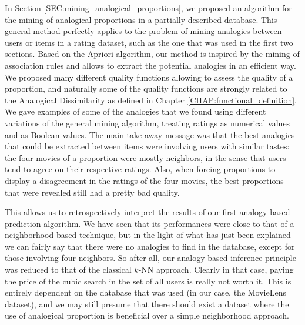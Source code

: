 In Section \ref{SEC:mining_analogical_proportions}, we proposed an algorithm for the mining of analogical
proportions in a partially described database. This general method perfectly
applies to the problem of mining analogies between users or items in a rating
dataset, such as the one that was used in the first two sections. Based on the
Apriori algorithm, our method is inspired by the mining of association rules
and allows to extract the potential analogies in an efficient way.
We proposed many different quality functions allowing to assess the quality of
a proportion, and naturally some of the quality functions are strongly related
to the Analogical Dissimilarity as defined in Chapter
\ref{CHAP:functional_definition}. We gave
examples of some of the analogies that we found using different variations of
the general mining algorithm, treating ratings as numerical values and as
Boolean values. The main take-away message was that the best analogies that
could be extracted between items were involving users with similar tastes: the four movies of a
proportion were mostly neighbors, in the sense that users tend to agree on
their respective ratings. Also, when forcing proportions to display a
disagreement in the ratings of the four movies, the best proportions that were
revealed still had a pretty bad quality.

This allows us to retrospectively interpret the results of our first
analogy-based prediction algorithm. We have seen that its performances were close to
that of a neighborhood-based technique, but in the light of what has just been
explained we can fairly say that there were no analogies to find in the
database, except for those involving four neighbors. So after all, our
analogy-based inference principle was reduced to that of the classical $k$-NN
approach. Clearly in that case, paying the price of the cubic search in the set
of all users is really not worth it. This is entirely dependent on the database
that was used (in our case, the MovieLens dataset), and we may still presume
that there should exist a dataset where the use of analogical proportion is
beneficial over a simple neighborhood approach.

